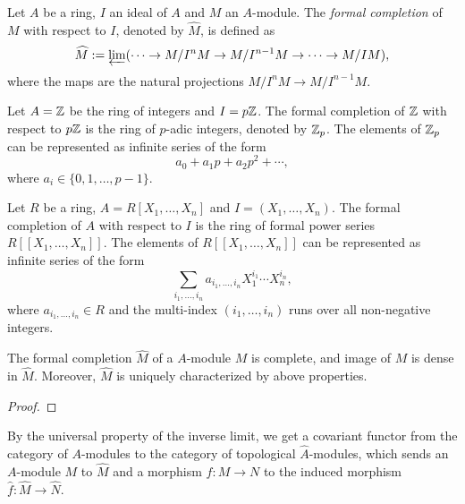     \begin{definition}\label{def: formal completion}
        Let \(A\) be a ring, \(I\) an ideal of \(A\) and \(M\) an \(A\)-module. 
        The \emph{formal completion} of \(M\) with respect to \(I\), denoted by \(\widehat{M}\), is defined as
        \[ \widehat{M} := \varprojlim ( \cdots \to M/I^n M \to M/I^{n-1} M \to \cdots \to M/I M), \]
        where the maps are the natural projections \(M/I^n M \to M/I^{n-1} M\).
    \end{definition}

    \begin{example}\label{eg: p-adic integer ring}
        Let \(A = {\mathbb{Z}}\) be the ring of integers and \(I = p{\mathbb{Z}}\).
        The formal completion of \({\mathbb{Z}}\) with respect to \(p{\mathbb{Z}}\) is the ring of \(p\)-adic integers, denoted by \({\mathbb{Z}}_p\).
        The elements of \({\mathbb{Z}}_p\) can be represented as infinite series of the form
        \[ a_0 + a_1 p + a_2 p^2 + \cdots, \]
        where \(a_i \in \{0, 1, \ldots, p-1\}\).
    \end{example}

    \begin{example}\label{eg: ring of formal power series}
        Let \(R\) be a ring, \(A=R[X_1, \ldots, X_n]\) and \(I = (X_1, \ldots, X_n)\).
        The formal completion of \(A\) with respect to \(I\) is the ring of formal power series \(R[[X_1, \ldots, X_n]]\).
        The elements of \(R[[X_1, \ldots, X_n]]\) can be represented as infinite series of the form
        \[ \sum_{i_1,\ldots,i_n} a_{i_1, \ldots, i_n} X_1^{i_1} \cdots X_n^{i_n}, \]
        where \(a_{i_1, \ldots, i_n} \in R\) and the multi-index \((i_1, \ldots, i_n)\) runs over all non-negative integers.
    \end{example}

    \begin{proposition}\label{prop: completion is complete}
        The formal completion \(\widehat{M}\) of a \(A\)-module \(M\) is complete, and image of \(M\) is dense in \(\widehat{M}\).
        Moreover, \(\widehat{M}\) is uniquely characterized by above properties.
    \end{proposition}
    \begin{proof}
    \end{proof}

    By the universal property of the inverse limit, 
    we get a covariant functor from the category of \(A\)-modules to the category of topological \(\widehat{A}\)-modules, 
    which sends an \(A\)-module \(M\) to \(\widehat{M}\) and a morphism \(f: M \to N\) to the induced morphism \(\widehat{f}: \widehat{M} \to \widehat{N}\).

